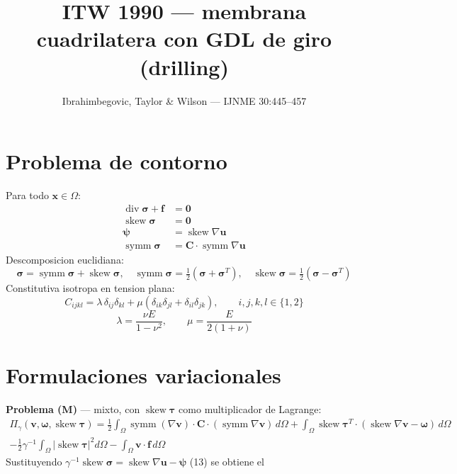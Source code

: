 \documentclass[11pt]{article}
\newcommand{\symm}{\operatorname{symm}}
\newcommand{\skewop}{\operatorname{skew}}
\begin{document}
\title{ITW 1990 --- membrana cuadrilatera con GDL de giro (drilling)}
\author{Ibrahimbegovic, Taylor \& Wilson --- IJNME 30:445--457}
\date{}\maketitle

\section{Problema de contorno}
Para todo $\mathbf{x}\in\Omega$:
\begin{align}
\operatorname{div}\boldsymbol\sigma + \mathbf f &= \mathbf 0 \tag{1}\\
\skewop\boldsymbol\sigma &= \mathbf 0 \tag{2}\\
\boldsymbol\psi &= \skewop\nabla\mathbf u \tag{3}\\
\symm\boldsymbol\sigma &= \mathbf C\cdot\symm\nabla\mathbf u \tag{4}
\end{align}
Descomposicion euclidiana:
\begin{equation}
\boldsymbol\sigma=\symm\boldsymbol\sigma+\skewop\boldsymbol\sigma,\quad
\symm\boldsymbol\sigma=\tfrac12(\boldsymbol\sigma+\boldsymbol\sigma^{T}),\quad
\skewop\boldsymbol\sigma=\tfrac12(\boldsymbol\sigma-\boldsymbol\sigma^{T})
\tag{5--7}
\end{equation}
Constitutiva isotropa en tension plana:
\begin{equation}
C_{ijkl}=\lambda\,\delta_{ij}\delta_{kl}+\mu(\delta_{ik}\delta_{jl}+\delta_{il}\delta_{jk}),
\qquad i,j,k,l\in\{1,2\}
\tag{8}
\end{equation}
\begin{equation}
\lambda=\frac{\nu E}{1-\nu^{2}},\qquad \mu=\frac{E}{2(1+\nu)}
\tag{9,10}
\end{equation}

\section{Formulaciones variacionales}
\textbf{Problema (M)} --- mixto, con $\skewop\boldsymbol\tau$ como multiplicador de Lagrange:
\begin{multline}
\Pi_{\gamma}(\mathbf v,\boldsymbol\omega,\skewop\boldsymbol\tau)=
\tfrac12\int_{\Omega}\symm(\nabla\mathbf v)\cdot\mathbf C\cdot(\symm\nabla\mathbf v)\,d\Omega
+\int_{\Omega}\skewop\boldsymbol\tau^{T}\cdot(\skewop\nabla\mathbf v-\boldsymbol\omega)\,d\Omega\\
-\tfrac12\gamma^{-1}\int_{\Omega}|\skewop\boldsymbol\tau|^{2}d\Omega
-\int_{\Omega}\mathbf v\cdot\mathbf f\,d\Omega
\tag{11}
\end{multline}
Sustituyendo $\gamma^{-1}\skewop\boldsymbol\sigma=\skewop\nabla\mathbf u-\boldsymbol\psi$ (13) se obtiene el
\end{document}
